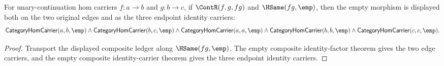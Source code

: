 \begin{theorem}
\label{thm:category-comp-result-empty-edge-identity-carriers}
For unary-continuation hom carriers $f:a\to b$ and $g:b\to c$, if
$\ContR(f,g,fg)$ and $\HSame(fg,\emp)$, then the empty morphism is displayed
both on the two original edges and as the three endpoint identity carriers:
$$
\mathsf{CategoryHomCarrier}(a,b,\emp)\wedge
\mathsf{CategoryHomCarrier}(b,c,\emp)\wedge
\mathsf{CategoryHomCarrier}(a,a,\emp)\wedge
\mathsf{CategoryHomCarrier}(b,b,\emp)\wedge
\mathsf{CategoryHomCarrier}(c,c,\emp).
$$
\end{theorem}
\begin{proof}
Transport the displayed composite ledger along $\HSame(fg,\emp)$. The empty
composite identity-factor theorem gives the two edge carriers, and the empty
composite identity-carrier theorem gives the three endpoint identity carriers.
\end{proof}
